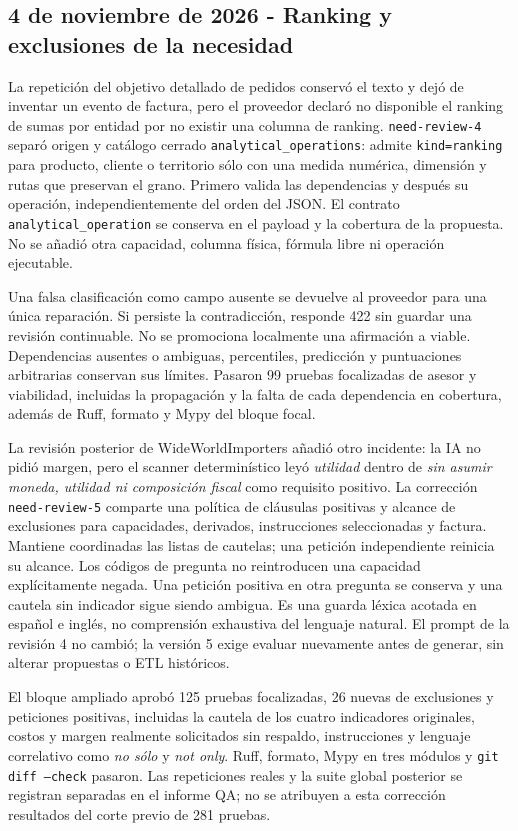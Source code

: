 \documentclass[11pt,letterpaper]{article}
\newcommand{\file}[1]{\texttt{#1}}
\begin{document}
\subsection{4 de noviembre de 2026 - Ranking y exclusiones de la necesidad}

La repetición del objetivo detallado de pedidos conservó el texto y dejó de
inventar un evento de factura, pero el proveedor declaró no disponible el
ranking de sumas por entidad por no existir una columna de ranking.
\file{need-review-4} separó origen y catálogo cerrado
\file{analytical\_operations}: admite \file{kind=ranking} para producto,
cliente o territorio sólo con una medida numérica, dimensión y rutas que
preservan el grano. Primero valida las dependencias y después su operación,
independientemente del orden del JSON. El contrato \file{analytical\_operation}
se conserva en el payload y la cobertura de la propuesta. No se añadió otra
capacidad, columna física, fórmula libre ni operación ejecutable.

Una falsa clasificación como campo ausente se devuelve al proveedor para una
única reparación. Si persiste la contradicción, responde 422 sin guardar una
revisión continuable. No se promociona localmente una afirmación a viable.
Dependencias ausentes o ambiguas, percentiles, predicción y puntuaciones
arbitrarias conservan sus límites. Pasaron 99 pruebas focalizadas de asesor y
viabilidad, incluidas la propagación y la falta de cada dependencia en cobertura,
además de Ruff, formato y Mypy del bloque focal.

La revisión posterior de WideWorldImporters añadió otro incidente: la IA no
pidió margen, pero el scanner determinístico leyó \emph{utilidad} dentro de
\emph{sin asumir moneda, utilidad ni composición fiscal} como requisito
positivo. La corrección \file{need-review-5} comparte una política de cláusulas
positivas y alcance de exclusiones para capacidades, derivados, instrucciones
seleccionadas y factura. Mantiene coordinadas las listas de cautelas; una
petición independiente reinicia su alcance. Los códigos de pregunta no
reintroducen una capacidad explícitamente negada. Una petición positiva en
otra pregunta se conserva y una cautela sin indicador sigue siendo ambigua.
Es una guarda léxica acotada en español e inglés, no comprensión exhaustiva
del lenguaje natural. El prompt de la revisión 4 no cambió; la versión 5 exige
evaluar nuevamente antes de generar, sin alterar propuestas o ETL históricos.

El bloque ampliado aprobó 125 pruebas focalizadas, 26 nuevas de exclusiones y
peticiones positivas, incluidas la cautela de los cuatro indicadores originales,
costos y margen realmente solicitados sin respaldo, instrucciones y lenguaje
correlativo como \emph{no sólo} y \emph{not only}. Ruff, formato, Mypy en tres
módulos y \file{git diff --check} pasaron. Las repeticiones reales y la suite
global posterior se registran separadas en el informe QA; no se atribuyen a
esta corrección resultados del corte previo de 281 pruebas.
\end{document}
